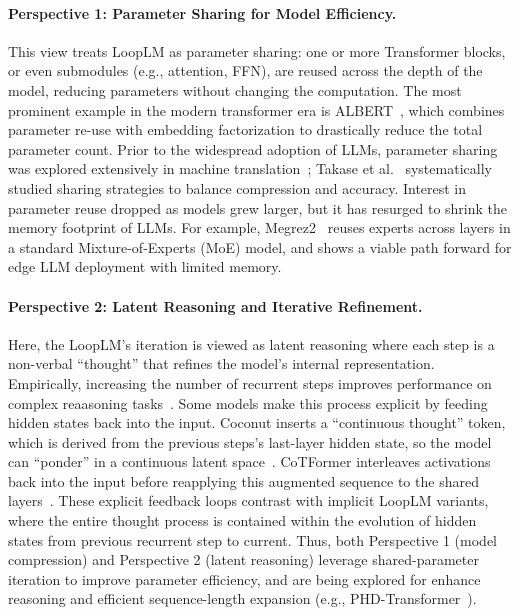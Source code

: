 \documentclass[]{bytedance_seed}
\newcommand{\1}{\mathbf{1}}
\newcommand{\ut}{LoopLM}
\begin{document}
\paragraph{Perspective 1: Parameter Sharing for Model Efficiency.} This view treats \ut{} as parameter sharing: one or more Transformer blocks, or even submodules (e.g., attention, FFN), are reused across the depth of the model, reducing parameters without changing the computation. The most prominent example in the modern transformer era is ALBERT~\cite{lan2019albert}, which combines parameter re-use with embedding factorization to drastically reduce the total parameter count. Prior to the widespread adoption of LLMs, parameter sharing was explored extensively in machine translation~\cite{dabre2019recurrent}; Takase et al.~\cite{takase2021lessons} systematically studied sharing strategies to balance compression and accuracy. Interest in parameter reuse dropped as models grew larger, but it has resurged to shrink the memory footprint of LLMs. For example, Megrez2~\cite{li2025megrez2} reuses experts across layers in a standard Mixture-of-Experts (MoE) model, and shows a viable path forward for edge LLM deployment with limited memory.

\paragraph{Perspective 2: Latent Reasoning and Iterative Refinement.}
Here, the \ut{}'s iteration is viewed as latent reasoning where each step is a non-verbal ``thought'' that refines the model's internal representation. Empirically, increasing the number of recurrent steps improves performance on complex reaasoning tasks~\cite{geiping2025scaling, saunshi2025reasoning}. Some models make this process explicit by feeding hidden states back into the input. Coconut inserts a ``continuous thought'' token, which is derived from the previous steps's last-layer hidden state, so the model can ``ponder'' in a continuous latent space~\cite{hao2024training}. CoTFormer interleaves activations back into the input before reapplying this augmented sequence to the shared layers~\cite{mohtashami2023cotformer}. These explicit feedback loops contrast with implicit \ut{} variants, where the entire thought process is contained within the evolution of hidden states from previous recurrent step to current. Thus, both Perspective 1 (model compression) and Perspective 2 (latent reasoning) leverage shared-parameter iteration to improve parameter efficiency, and are being explored for enhance reasoning and efficient sequence-length expansion (e.g., PHD-Transformer~\cite{wu2025efficient}).
\end{document}
